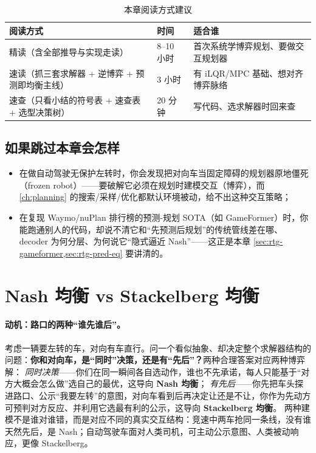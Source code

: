 \begin{table}[H]\centering\small
\caption{本章阅读方式建议}
\label{tab:rtg-reading}
\begin{tabular}{lll}
\toprule
阅读方式 & 时间 & 适合谁 \\
\midrule
精读（含全部推导与实现走读） & 8--10 小时 & 首次系统学博弈规划、要做交互规划器 \\
速读（抓三套求解器 + 逆博弈 + 预测即均衡主线） & 3 小时 & 有 iLQR/MPC 基础、想对齐博弈脉络 \\
速查（只看小结的符号表 + 速查表 + 选型决策树） & 20 分钟 & 写代码、选求解器时回来查 \\
\bottomrule
\end{tabular}
\end{table}

\subsection*{如果跳过本章会怎样}
\begin{itemize}
  \item 在做自动驾驶无保护左转时，你会发现把对向车当固定障碍的规划器原地僵死（frozen robot）——要破解它必须在规划时建模交互（博弈），而 \cref{ch:planning} 的搜索/采样/优化都默认环境被动，给不出这种交互策略；
  \item 在复现 Waymo/nuPlan 排行榜的预测-规划 SOTA（如 GameFormer）时，你能跑通别人的代码，却说不清它和“先预测后规划”的传统管线差在哪、decoder 为何分层、为何说它“隐式逼近 Nash”——这正是本章 \cref{sec:rtg-gameformer,sec:rtg-pred-eq} 要讲清的。
\end{itemize}

\section{Nash 均衡 vs Stackelberg 均衡}
\label{sec:rtg-concept}

\paragraph{动机：路口的两种“谁先谁后”。}
考虑一辆要左转的车，对向有车直行。问一个看似抽象、却决定整个求解器结构的问题：\textbf{你和对向车，是“同时”决策，还是有“先后”？}两种合理答案对应两种博弈解\cite{sadigh2016planning}：
\emph{同时决策}——你们在同一瞬间各自选动作，谁也不先承诺，每人只能基于“对方大概会怎么做”选自己的最优，这导向 \textbf{Nash 均衡}；
\emph{有先后}——你先把车头探进路口、公示“我要左转”的意图，对向车看到后再决定让还是不让，你作为先动方可预判对方反应、并利用它选最有利的公示，这导向 \textbf{Stackelberg 均衡}。
两种建模不是谁对谁错，而是对应不同的真实交互结构：竞速中两车抢同一条线，没有谁天然先后，是 Nash；自动驾驶车面对人类司机，可主动公示意图、人类被动响应，更像 Stackelberg。

